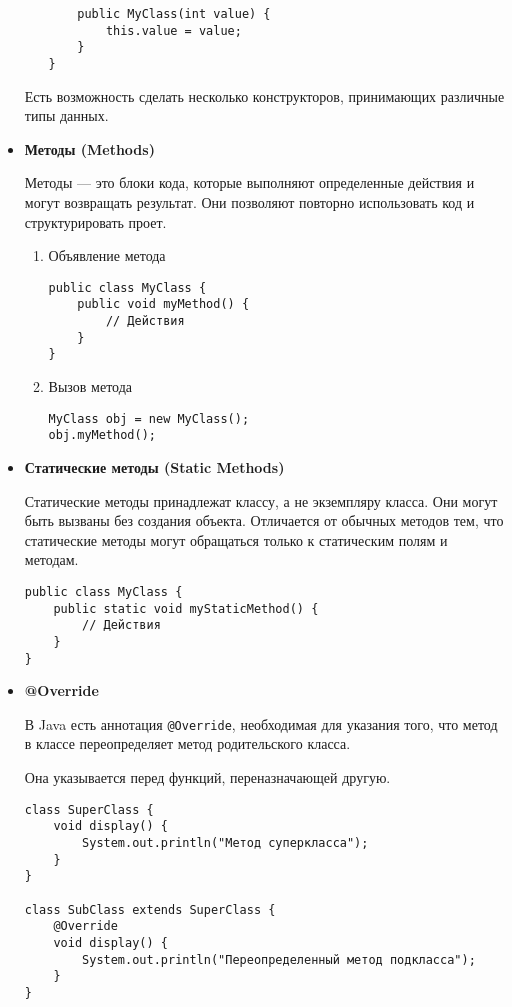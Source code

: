 \begin{itemize}
\begin{enumerate}
\begin{verbatim}
    public MyClass(int value) {
        this.value = value;
    }
}
        \end{verbatim}
    \end{enumerate}
    Есть возможность сделать несколько конструкторов, принимающих различные типы данных.  
    
    \item \textbf{Методы (Methods)} \par
    Методы — это блоки кода, которые выполняют определенные действия и могут возвращать результат. Они позволяют повторно использовать код и структурировать проет.
    \begin{enumerate}
        \item Объявление метода
        \begin{verbatim}
public class MyClass {
    public void myMethod() {
        // Действия
    }
}
        \end{verbatim}
        \item Вызов метода
        \begin{verbatim}
MyClass obj = new MyClass();
obj.myMethod();
        \end{verbatim}
    \end{enumerate}

    \item \textbf{Статические методы (Static Methods)} \par
    Статические методы принадлежат классу, а не экземпляру класса. Они могут быть вызваны без создания объекта. Отличается от обычных методов тем, что статические методы могут обращаться только к статическим полям и методам.

    \begin{verbatim}
public class MyClass {
    public static void myStaticMethod() {
        // Действия
    }
}
    \end{verbatim}

    \item \textbf{@Override} \par
    В Java есть аннотация \texttt{@Override}, необходимая для указания того, что метод в классе переопределяет метод родительского класса.\par
    Она указывается перед функций, переназначающей другую.
    \begin{verbatim}
class SuperClass {
    void display() {
        System.out.println("Метод суперкласса");
    }
}

class SubClass extends SuperClass {
    @Override
    void display() {
        System.out.println("Переопределенный метод подкласса");
    }
}
    \end{verbatim}
    
\end{itemize}

